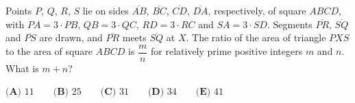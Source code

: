 Points $P$, $Q$, $R$, $S$ lie on sides $\overline{AB}$, $\overline{BC}$, $\overline{CD}$, $\overline{DA}$, respectively, of square $ABCD$, with $PA=3\cdot PB$, $QB=3\cdot QC$, $RD=3\cdot RC$ and $SA=3\cdot SD$. Segments $\overline{PR}$, $\overline{SQ}$ and $\overline{PS}$ are drawn, and $\overline{PR}$ meets $\overline{SQ}$ at $X$. The ratio of the area of triangle $PXS$ to the area of square $ABCD$ is $\dfrac mn$ for relatively prime positive integers $m$ and $n$. What is $m+n$?

$\textbf{(A) }11\qquad\textbf{(B) }25\qquad\textbf{(C) }31\qquad\textbf{(D) }34\qquad\textbf{(E) }41$
